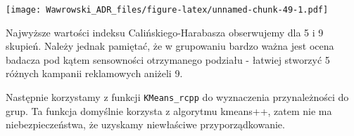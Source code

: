 \documentclass[
]{book}
\newenvironment{Shaded}{\begin{snugshade}}{\end{snugshade}}
\newcommand{\ControlFlowTok}[1]{\textcolor[rgb]{0.13,0.29,0.53}{\textbf{#1}}}
\newcommand{\DataTypeTok}[1]{\textcolor[rgb]{0.13,0.29,0.53}{#1}}
\newcommand{\DecValTok}[1]{\textcolor[rgb]{0.00,0.00,0.81}{#1}}
\newcommand{\KeywordTok}[1]{\textcolor[rgb]{0.13,0.29,0.53}{\textbf{#1}}}
\newcommand{\NormalTok}[1]{#1}
\newcommand{\OperatorTok}[1]{\textcolor[rgb]{0.81,0.36,0.00}{\textbf{#1}}}
\newcommand{\StringTok}[1]{\textcolor[rgb]{0.31,0.60,0.02}{#1}}
\begin{document}
\begin{Shaded}
\end{Shaded}

\texttt{[image: Wawrowski\_ADR\_files/figure-latex/unnamed-chunk-49-1.pdf]}

Najwyższe wartości indeksu Calińskiego-Harabasza obserwujemy dla 5 i 9 skupień. Należy jednak pamiętać, że w grupowaniu bardzo ważna jest ocena badacza pod kątem sensowności otrzymanego podziału - łatwiej stworzyć 5 różnych kampanii reklamowych aniżeli 9.

Następnie korzystamy z funkcji \texttt{KMeans\_rcpp} do wyznaczenia przynależności do grup. Ta funkcja domyślnie korzysta z algorytmu kmeans++, zatem nie ma niebezpieczeństwa, że uzyskamy niewłaściwe przyporządkowanie.

\begin{Shaded}
\end{Shaded}
\end{document}
